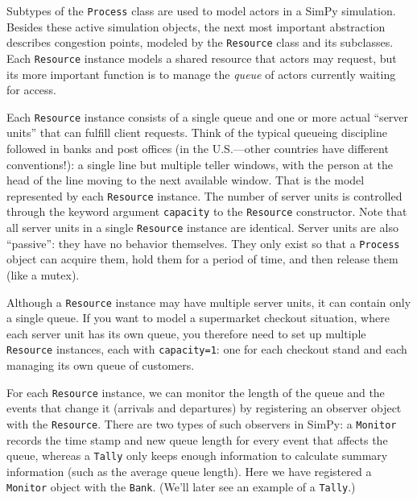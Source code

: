 Subtypes of the \texttt{Process} class  are used to model actors in a
SimPy simulation. Besides these active simulation objects, the next
most important abstraction describes congestion points, modeled by the
\texttt{Resource} class  and its subclasses. Each \texttt{Resource}
instance models a shared resource that actors may request, but its
more important function is to manage the \emph{queue} of actors
currently waiting for access.

Each \texttt{Resource} instance consists of a single queue and one or
more actual ``server units'' that can fulfill client requests. Think
of the typical queueing discipline followed in banks and post offices
(in the U.S.---other countries have different conventions!): a single
line but multiple teller windows, with the person at the head of the
line moving to the next available window. That is the model
represented by each \texttt{Resource} instance. The number of server
units is controlled through the keyword argument \texttt{capacity} to
the \texttt{Resource} constructor. Note that all server units in a
single \texttt{Resource} instance are identical. Server units are also
``passive'': they have no behavior themselves. They only exist so that
a \texttt{Process} object can acquire them, hold them for a period of
time, and then release them (like a mutex).

Although a \texttt{Resource} instance may have multiple server units,
it can contain only a single queue. If you want to model a supermarket
checkout situation, where each server unit has its own queue, you
therefore need to set up multiple \texttt{Resource} instances, each
with \texttt{capacity=1}: one for each checkout stand and each
managing its own queue of customers. 

For each \texttt{Resource} instance, we can monitor  the length of the
queue and the events that change it (arrivals and departures) by
registering an observer object with the \texttt{Resource}. There are
two types of such observers in SimPy: a \texttt{Monitor} records the
time stamp and new queue length for every event that affects the
queue, whereas a \texttt{Tally}  only keeps enough information to
calculate summary information (such as the average queue length).  Here
we have registered a \texttt{Monitor} object with the \texttt{Bank}.
(We'll later see an example of a \texttt{Tally}.)

